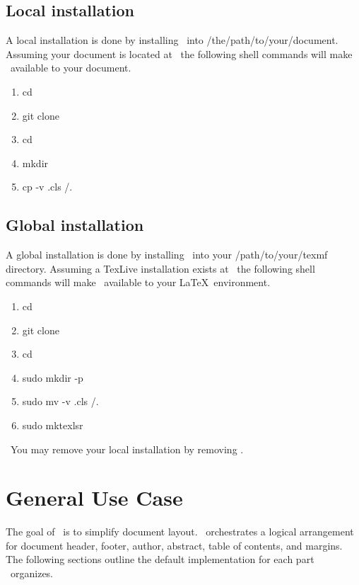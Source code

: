 \documentclass[12pt]{tlc-article}
\begin{document}
\subsection{Local installation}
A local installation is done by installing \tlcA\ into
/the/path/to/your/document.  Assuming your document is located at \tlcMyDoc\ the
following shell commands will make \tlcA\ available to your document.

\begin{enumerate}
  \item cd \tlcHome
  \item git clone \tlcRepo\
  \item cd \tlcProduct\
  \item mkdir \tlcMyDoc
  \item cp -v \tlcProduct.cls \tlcMyDoc/.
\end{enumerate}

\clearpage
\subsection{Global installation}
A global installation is done by installing \tlcA\ into your /path/to/your/texmf
directory.  Assuming a TexLive installation exists at \texDist\ the following
shell commands will make \tlcA\ available to your \LaTeX\ environment.

\begin{enumerate}
  \item cd \tlcHome
  \item git clone \tlcRepo\
  \item cd \tlcProduct\
  \item sudo mkdir -p \tlcGlobalDist
  \item sudo mv -v \tlcProduct.cls \tlcGlobalDist/.
  \item sudo mktexlsr \texDist\
\end{enumerate}

\bigskip
\tlcNote\ You may remove your local installation by removing \tlcA.

\clearpage
\section{General Use Case}
The goal of \tlcA\ is to simplify document layout.  \tlcA\ orchestrates a
logical arrangement for document header, footer, author, abstract, table of
contents, and margins.  The following sections outline the default
implementation for each part \tlcA\ organizes. 
\end{document}
